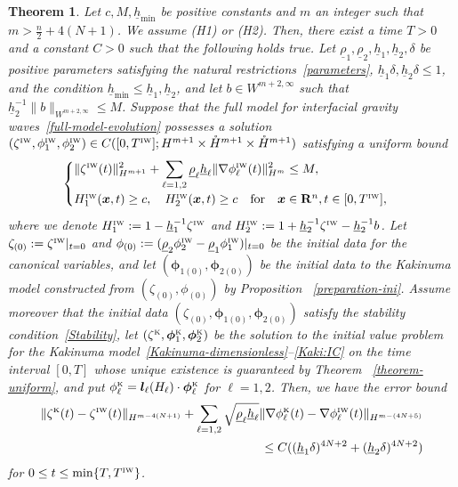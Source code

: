 \documentclass[11pt,leqno]{article}
\newtheorem{theorem}{\bf Theorem}[section]
\numberwithin{equation}{section}
\numberwithin{figure}{section}
\begin{document}
\begin{theorem}\label{theorem-justification}
Let $c, M, \underline{h}_\mathrm{min}$ be positive constants and $m$ an integer such that ${m>\frac{n}{2}+4(N+1)}$. 
We assume {\rm (H1)} or {\rm (H2)}. 
Then, there exist a time $T>0$ and a constant $C>0$ such that the following holds true. 
Let $\underline{\rho}_1, \underline{\rho}_2, \underline{h}_1, \underline{h}_2, \delta$ be positive parameters satisfying 
the natural restrictions~\eqref{parameters}, $\underline{h}_1\delta, \underline{h}_2\delta \leq 1$, and the condition 
${\underline{h}_\mathrm{min} \leq \underline{h}_1, \underline{h}_2}$, and let $b\in W^{m+2,\infty}$ such that 
$\underline{h}_2^{-1}\|b\|_{W^{m+2,\infty}}\leq M$. 
Suppose that the full model for interfacial gravity waves~\eqref{full-model-evolution} possesses a solution 
$(\zeta^{\mbox{\tiny\rm IW}},\phi_1^{\mbox{\tiny\rm IW}},\phi_2^{\mbox{\tiny\rm IW}}) \in 
 C([0,T^{\mbox{\tiny\rm IW}}];H^{m+1}\times\mathring{H}^{m+1}\times\mathring{H}^{m+1})$ satisfying a uniform bound 
%
\[
\begin{cases}
 \displaystyle
 \|\zeta^{\mbox{\tiny\rm IW}}(t)\|_{H^{m+1}}^2 + \sum_{\ell=1,2}\underline{\rho}_\ell\underline{h}_\ell
  \|\nabla\phi_\ell^{\mbox{\tiny\rm IW}}(t)\|_{H^m}^2 \leq M, \\
 H_1^{\mbox{\tiny\rm IW}}(\bm{x},t) \geq c, \quad H_2^{\mbox{\tiny\rm IW}}(\bm{x},t) \geq c
  \quad\mbox{for}\quad \bm{x}\in\mathbf{R}^n, t\in[0,T^{\mbox{\tiny\rm IW}}],
\end{cases}
\]
%
where we denote $H_1^{\mbox{\tiny\rm IW}}:=1-\underline{h}_1^{-1}\zeta^{\mbox{\tiny\rm IW}}$ and 
$H_2^{\mbox{\tiny\rm IW}}:=1+\underline{h}_2^{-1}\zeta^{\mbox{\tiny\rm IW}}-\underline{h}_2^{-1}b$. 
Let $\zeta_{(0)}:=\zeta^{\mbox{\tiny\rm IW}}|_{t=0}$ and 
$\phi_{(0)}:=(\underline{\rho}_2\phi_2^{\mbox{\tiny\rm IW}}-\underline{\rho}_1\phi_1^{\mbox{\tiny\rm IW}})|_{t=0}$ 
be the initial data for the canonical variables, and let $(\bm{\phi}_{1(0)},\bm{\phi}_{2(0)})$ be the initial data 
to the Kakinuma model constructed from $(\zeta_{(0)},\phi_{(0)})$ by Proposition {\rm~\ref{preparation-ini}}. 
Assume moreover that the initial data $(\zeta_{(0)},\bm{\phi}_{1(0)},\bm{\phi}_{2(0)})$ satisfy the stability 
condition~\eqref{Stability}, 
let $(\zeta^{\mbox{\tiny\rm K}}, \bm{\phi}_1^{\mbox{\tiny\rm K}},\bm{\phi}_2^{\mbox{\tiny\rm K}})$ be the 
solution to the initial value problem for the Kakinuma model~\eqref{Kakinuma-dimensionless}--\eqref{Kaki:IC} 
on the time interval $[0,T]$ whose unique existence is guaranteed by Theorem {\rm~\ref{theorem-uniform}}, 
and put $\phi_\ell^{\mbox{\tiny\rm K}}=\bm{l}_\ell(H_\ell)\cdot\bm{\phi}_\ell^{\mbox{\tiny\rm K}}$ for $\ell=1,2$. 
Then, we have the error bound 
%
\begin{align*}
 \|\zeta^{\mbox{\tiny\rm K}}(t)-\zeta^{\mbox{\tiny\rm IW}}(t)\|_{H^{m-4(N+1)}}
 + \sum_{\ell=1,2} \sqrt{ \underline{\rho}_\ell\underline{h}_\ell }
  \|\nabla\phi_\ell^{\mbox{\tiny\rm K}}(t)-\nabla\phi_\ell^{\mbox{\tiny\rm IW}}(t)\|_{H^{m-(4N+5)}} \\
\leq C((\underline{h}_1\delta)^{4N+2}+(\underline{h}_2\delta)^{4N+2})
\end{align*}
%
for $0\leq t\leq \min\{T,T^{\mbox{\tiny\rm IW}}\}$. 
\end{theorem}
\end{document}
